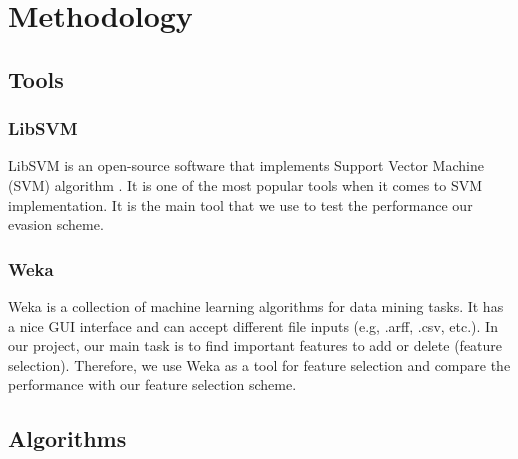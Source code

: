 \documentclass[11pt]{article}
\begin{document}


\section{Methodology}\label{sec:metho}

\subsection{Tools}
\subsubsection{LibSVM}
LibSVM \cite{CC01a} is an open-source software that implements Support Vector Machine (SVM) algorithm \cite{cortes1995support}. It is one of the most popular tools when it comes to SVM implementation. It is the main tool that we use to test the performance our evasion scheme. 

\subsubsection{Weka}
Weka \cite{hall2009weka} is a collection of machine learning algorithms for data mining tasks. It has a nice GUI interface and can accept different file inputs (e.g, .arff, .csv, etc.). In our project, our main task is to find important features to add or delete (feature selection). Therefore, we use Weka as a tool for feature selection and compare the performance with our feature selection scheme.

\subsection{Algorithms}
\end{document}
